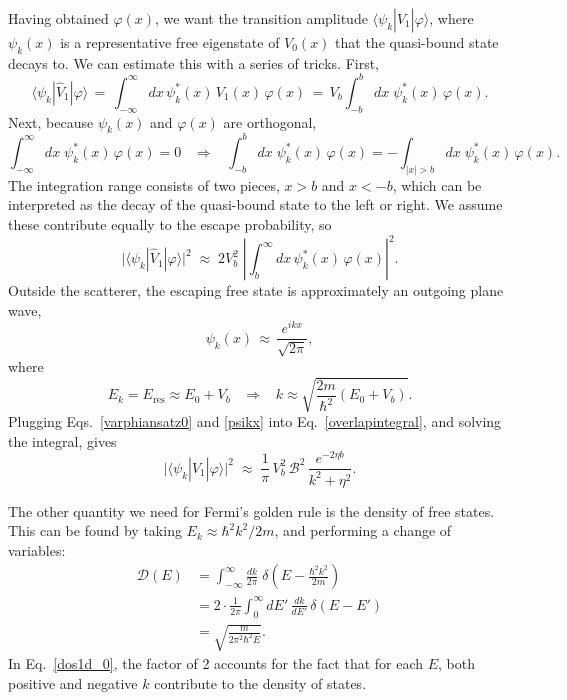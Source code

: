 \documentclass[prx,12pt]{revtex4-2}
\begin{document}
Having obtained $\varphi(x)$, we want the transition amplitude
$\langle\psi_k|\hat{V}_1|\varphi\rangle$, where $\psi_k(x)$ is a
representative free eigenstate of $V_0(x)$ that the quasi-bound state
decays to.  We can estimate this with a series of tricks.  First,
\begin{equation}
  \langle\psi_k|\hat{V}_1|\varphi\rangle \,=\, \int_{-\infty}^\infty dx \, \psi_k^*(x)\, V_1(x)\, \varphi(x) \,=\, V_b \int_{-b}^b dx \; \psi_k^*(x) \,\varphi(x).
\end{equation}
Next, because $\psi_k(x)$ and $\varphi(x)$ are orthogonal,
\begin{equation}
  \int_{-\infty}^\infty dx \; \psi_k^*(x) \,\varphi(x) = 0
  \;\;\;\Rightarrow \;\;\;  
  \int_{-b}^b dx \; \psi_k^*(x) \,\varphi(x) = - \int_{|x| > b} dx \; \psi_k^*(x) \,\varphi(x).
\end{equation}
The integration range consists of two pieces, $x > b$ and $x < -b$,
which can be interpreted as the decay of the quasi-bound state to the
left or right.  We assume these contribute equally to the escape
probability, so
\begin{equation}
  \big| \langle\psi_k|\hat{V}_1|\varphi\rangle \big|^2
  \;\approx\; 2 V_b^2 \;
  \left| \int_{b}^\infty dx \, \psi_k^*(x)\, \varphi(x)\right|^2.
  \label{overlapintegral}
\end{equation}
Outside the scatterer, the escaping free state is approximately an
outgoing plane wave,
\begin{equation}
  \psi_k(x) \,\approx\, \frac{e^{ikx}}{\sqrt{2\pi}},
  \label{psikx}
\end{equation}
where
\begin{equation}
  E_k = E_{\mathrm{res}} \approx E_0 + V_b \;\;\;\Rightarrow \;\;\; k \approx \sqrt{\frac{2m}{\hbar^2}(E_0+V_b)}.
\end{equation}
Plugging Eqs.~\eqref{varphiansatz0} and \eqref{psikx} into
Eq.~\eqref{overlapintegral}, and solving the integral, gives
\begin{equation}
  \big| \langle\psi_k|\hat{V}_1|\varphi\rangle \big|^2
  \;\approx \; \frac{1}{\pi}\, V_b^2 \, \mathcal{B}^2\,
  \frac{e^{-2\eta b}}{k^2 + \eta^2}.
  \label{overlap1d}
\end{equation}

The other quantity we need for Fermi's golden rule is the density of
free states.  This can be found by taking $E_k \approx \hbar^2k^2/2m$,
and performing a change of variables:
\begin{align}
  \mathcal{D}(E)
  &= \int_{-\infty}^\infty \frac{dk}{2\pi} \; \delta\left(E-\frac{\hbar^2k^2}{2m}\right) \\
  &= 2 \cdot \frac{1}{2\pi} \int_0^\infty dE' \, \frac{dk}{dE'} \, \delta(E-E') \label{dos1d_0} \\
  &= \sqrt{\frac{m}{2\pi^2\hbar^2 E}}.
  \label{dos1d}
\end{align}
In Eq.~\eqref{dos1d_0}, the factor of 2 accounts for the fact that for
each $E$, both positive and negative $k$ contribute to the density of
states.
\end{document}
